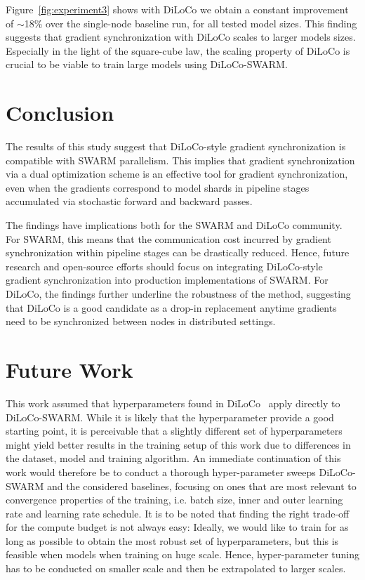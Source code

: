 \documentclass{article}
\begin{document}
Figure~\ref{fig:experiment3} shows with DiLoCo we obtain a constant improvement
of $\sim$18\% over the single-node baseline run, for all tested model sizes.
This finding suggests that gradient synchronization with DiLoCo scales to larger
models sizes. Especially in the light of the square-cube law, the scaling
property of DiLoCo is crucial to be viable to train large models using
DiLoCo-SWARM.

\section{Conclusion}

The results of this study suggest that DiLoCo-style gradient synchronization is
compatible with SWARM parallelism. This implies that gradient 
synchronization via a dual optimization scheme is an effective tool for gradient
synchronization, even when the gradients correspond to model shards in pipeline
stages accumulated via stochastic forward and backward passes.

The findings have implications both for the SWARM and DiLoCo community. For
SWARM, this means that the communication cost incurred by gradient
synchronization within pipeline stages can be drastically reduced. Hence, future
research and open-source efforts should focus on integrating DiLoCo-style 
gradient synchronization into production implementations of SWARM. For DiLoCo,
the findings further underline the robustness of the method, suggesting that
DiLoCo is a good candidate as a drop-in replacement anytime gradients need to be
synchronized between nodes in distributed settings.

\section{Future Work}

This work assumed that hyperparameters found in
DiLoCo~\cite{douillard2023diloco} apply directly to DiLoCo-SWARM. While it is
likely that the hyperparameter provide a good starting point, it is perceivable
that a slightly different set of hyperparameters might yield better results in
the training setup of this work due to differences in the dataset, model and
training algorithm. An immediate continuation of this work would therefore be to
conduct a thorough hyper-parameter sweeps DiLoCo-SWARM and the considered
baselines, focusing on ones that are most relevant to convergence properties of 
the training, i.e. batch size, inner and outer learning rate and learning rate
schedule. It is to be noted that finding the right trade-off for the compute
budget is not always easy: Ideally, we would like to train for as long as
possible to obtain the most robust set of hyperparameters, but this is feasible
when models when training on huge scale. Hence, hyper-parameter tuning has to be
conducted on smaller scale and then be extrapolated to larger scales.
\end{document}
